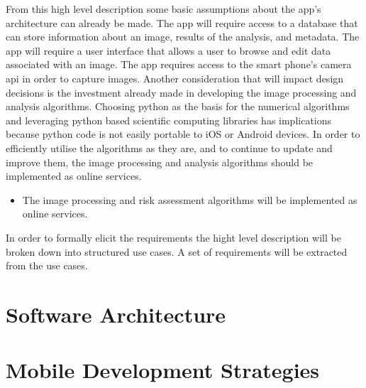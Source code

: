 From this high level description some basic assumptions about the app’s architecture can already be made. The app will require access to a database that can store information about an image, results of the analysis, and metadata. The app will require a user interface that allows a user to browse and edit data associated with an image. The app requires access to the smart phone’s camera api in order to capture images.
Another consideration that will impact design decisions is the investment already made in developing the image processing and analysis algorithms. Choosing python as the basis for the numerical algorithms and leveraging python based scientific computing libraries has implications because python code is not easily portable to iOS or Android devices. In order to efficiently utilise the algorithms as they are, and to continue to update and improve them, the image processing and analysis algorithms should be implemented as online services.

\begin{itemize}[label={}]
\item The image processing and risk assessment algorithms will be implemented as online services.
\end{itemize}

In order to formally elicit the requirements the hight level description will be broken down into structured use cases. A set of requirements will be extracted from the use cases.


\section{Software Architecture}


\section{Mobile Development Strategies}


